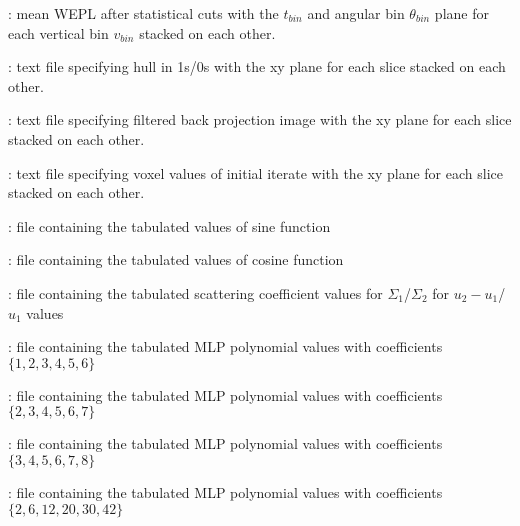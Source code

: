 \documentclass[landscape,12pt]{article}
\begin{document}
\begin{myEnumerate}[labelindent=1pt, leftmargin=*]
\begin{myEnumerate}[labelindent=1pt, leftmargin=*]
\begin{myEnumerate}[labelindent=1pt, leftmargin=*]
\begin{myEnumerate}[labelindent=1pt, leftmargin=*]
\begin{myEnumerate}[labelindent=1pt, leftmargin=*]
\begin{myEnumerate}[labelindent=1pt, leftmargin=*]
\begin{myEnumerate}[labelindent=1pt, leftmargin=*]
\begin{myEnumerate}[labelindent=1pt, leftmargin=*]
\begin{myEnumerate}[labelindent=1pt, leftmargin=*]
                                        \item {} \color{Black}: mean WEPL after statistical cuts with the $t_{bin}$ and angular bin $\theta_{bin}$ plane for each vertical bin $v_{bin}$ stacked on each other.
                                        \item {} \color{Black}: text file specifying hull in 1s/0s with the xy plane for each slice stacked on each other.
                                        \item {} \color{Black}: text file specifying filtered back projection image with the xy plane for each slice stacked on each other.
                                        \item {} \color{Black}: text file specifying voxel values of initial iterate with the xy plane for each slice stacked on each other.
                                        \item {} \color{Black}: file containing the tabulated values of sine function
                                        \item {} \color{Black}: file containing the tabulated values of cosine function
                                        \item {} \color{Black}: file containing the tabulated scattering coefficient values for $\Sigma_1$/$\Sigma_2$ for $u_2-u_1$/$u_1$ values
                                        \item {} \color{Black}: file containing the tabulated MLP polynomial values with coefficients $\{1,2,3,4,5,6\}$
                                        \item {} \color{Black}: file containing the tabulated MLP polynomial values with coefficients $\{2,3,4,5,6,7\}$
                                        \item {} \color{Black}: file containing the tabulated MLP polynomial values with coefficients $\{3,4,5,6,7,8\}$
                                        \item {} \color{Black}: file containing the tabulated MLP polynomial values with coefficients $\{2,6,12,20,30,42\}$

\end{myEnumerate}
\end{myEnumerate}
\end{myEnumerate}
\end{myEnumerate}
\end{myEnumerate}
\end{myEnumerate}
\end{myEnumerate}
\end{myEnumerate}
\end{myEnumerate}
\end{document}
